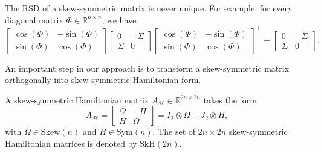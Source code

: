 \documentclass[final,onefignum,onetabnum,dvipsnames]{siamart251216}
\numberwithin{algorithm}{section}
\numberwithin{equation}{section}
\begin{document}
The RSD of a skew-symmetric matrix is never unique. For example, for every diagonal matrix $\Phi\in\mathbb{R}^{n\times n}$, we have
\begin{equation*}
    \begin{bmatrix}
        \cos(\Phi)&-\sin(\Phi)\\
        \sin(\Phi)&\cos(\Phi)
    \end{bmatrix}\begin{bmatrix}
                0&-\Sigma\\
                \Sigma& 0
            \end{bmatrix}\begin{bmatrix}
        \cos(\Phi)&-\sin(\Phi)\\
        \sin(\Phi)&\cos(\Phi)
    \end{bmatrix}^\top = \begin{bmatrix}
                0&-\Sigma\\
                \Sigma& 0
            \end{bmatrix}.
\end{equation*}

An important step in our approach is to transform a skew-symmetric matrix orthogonally into skew-symmetric Hamiltonian form.

\begin{definition}\label{def:hamiltonian}
    A skew-symmetric Hamiltonian matrix $A_\mathcal{H}\in\mathbb{R}^{2n\times 2n}$ takes the form
    \begin{equation} \label{eq:sham}
        A_\mathcal{H} = \begin{bmatrix}
            \Omega&-H\\
            H&\Omega
        \end{bmatrix} = I_2 \otimes \Omega + J_2 \otimes H,
    \end{equation}
    with $\Omega \in\mathrm{Skew}(n)$ and $H\in\mathrm{Sym}(n)$.
    The set of $2n \times 2n$ skew-symmetric Hamiltonian matrices is denoted by $\mathrm{SkH}(2n)$.
\end{definition}
\end{document}
